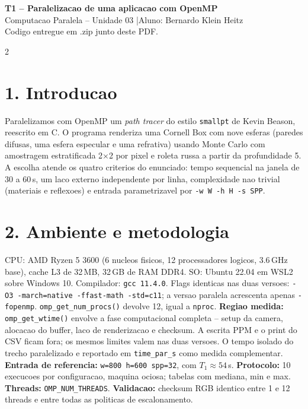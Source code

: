 \documentclass[10pt,a4paper]{article}
\begin{document}
\begin{center}
  {\large\bfseries T1 -- Paralelizacao de uma aplicacao com OpenMP} \\[2pt]
  {\small Computacao Paralela -- Unidade 03 \quad|\quad Aluno: Bernardo Klein Heitz} \\[1pt]
  {\footnotesize Codigo entregue em .zip junto deste PDF.}
\end{center}

\begin{multicols}{2}

\section*{1. Introducao}
Paralelizamos com OpenMP um \emph{path tracer} do estilo \texttt{smallpt} de
Kevin Beason, reescrito em C. O programa renderiza uma Cornell Box com nove
esferas (paredes difusas, uma esfera especular e uma refrativa) usando
Monte Carlo com amostragem estratificada 2$\times$2 por pixel e roleta russa a
partir da profundidade 5. A escolha atende os quatro criterios do enunciado:
tempo sequencial na janela de 30 a 60\,s, um laco externo independente por
linha, complexidade nao trivial (materiais e reflexoes) e entrada
parametrizavel por \texttt{-w W -h H -s SPP}.

\section*{2. Ambiente e metodologia}
CPU: AMD Ryzen 5 3600 (6 nucleos fisicos, 12 processadores logicos,
3.6\,GHz base), cache L3 de 32\,MB, 32\,GB de RAM DDR4. SO: Ubuntu 22.04
em WSL2 sobre Windows 10. Compilador: \texttt{gcc 11.4.0}. Flags identicas
nas duas versoes: \texttt{-O3 -march=native -ffast-math -std=c11}; a
versao paralela acrescenta apenas \texttt{-fopenmp}.
\texttt{omp\_get\_num\_procs()} devolve 12, igual a \texttt{nproc}.
\textbf{Regiao medida:} \texttt{omp\_get\_wtime()} envolve a fase
computacional completa -- setup da camera, alocacao do buffer, laco de
renderizacao e checksum. A escrita PPM e o print do CSV ficam fora; os
mesmos limites valem nas duas versoes. O tempo isolado do trecho
paralelizado e reportado em \texttt{time\_par\_s} como medida complementar.
\textbf{Entrada de referencia:} \texttt{w=800 h=600 spp=32}, com
$T_1 \approx 54$\,s. \textbf{Protocolo:} 10 execucoes por configuracao,
maquina ociosa; tabelas com mediana, min e max. \textbf{Threads:}
\texttt{OMP\_NUM\_THREADS}. \textbf{Validacao:} checksum RGB identico entre
1 e 12 threads e entre todas as politicas de escalonamento.


\end{multicols}
\end{document}
